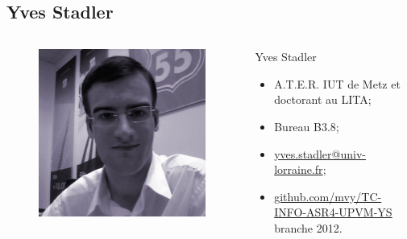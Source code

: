 \begin{frame}{\sectitle}
\def\subsectitle{Yves Stadler}
\subsection{\subsectitle}

\begin{columns}[c]

\begin{figure}
\includegraphics[width=\textwidth]{images/yves.png}
\end{figure}

\begin{block}{\subsectitle}
\begin{itemize}
\item A.T.E.R. IUT de Metz et doctorant au LITA;
\item Bureau B3.8;
\item \url{yves.stadler@univ-lorraine.fr};
\item \url{github.com/mvy/TC-INFO-ASR4-UPVM-YS} branche 2012.
\end{itemize}
\end{block}

\end{columns}

\end{frame}

